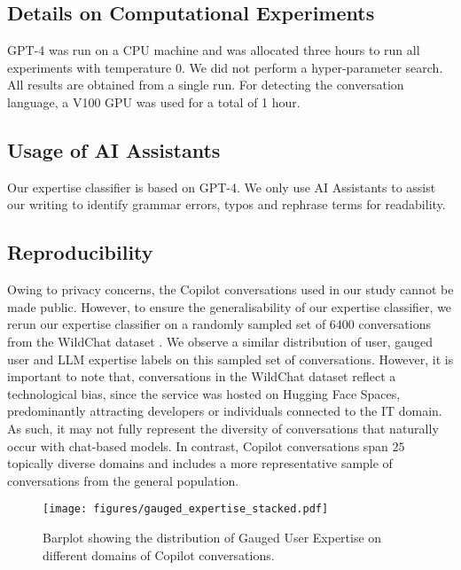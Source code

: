 \subsection{Details on Computational Experiments}
GPT-4 was run on a CPU machine and was allocated three hours to run all experiments with temperature 0. We did not perform a hyper-parameter search. All results are obtained from a single run. For detecting the conversation language, a V100 GPU was used for a total of 1 hour.

\subsection{Usage of AI Assistants}
Our expertise classifier is based on GPT-4. We only use AI Assistants to assist our writing to identify grammar errors, typos and rephrase terms for readability.







\subsection{Reproducibility}\label{wildchat}
Owing to privacy concerns, the Copilot conversations used in our study cannot be made public. However, to ensure the generalisability of our expertise classifier, we rerun our expertise classifier on a randomly sampled set of $6400$ conversations from the WildChat dataset \cite{zhao2024wildchat1mchatgptinteraction}. We observe a similar distribution of user, gauged user and LLM expertise labels on this sampled set of conversations. However, it is important to note that, conversations in the WildChat dataset reflect a technological bias, since the service was hosted on Hugging Face Spaces, predominantly attracting developers or individuals connected to the IT domain. As such, it may not fully represent the diversity of conversations that naturally occur with chat-based models. In contrast, Copilot conversations span $25$ topically diverse domains and includes a more representative sample of conversations from the general population.

\begin{figure}[t!]
    \centering
    \texttt{[image: figures/gauged\_expertise\_stacked.pdf]}
    \caption{Barplot showing the distribution of Gauged User Expertise on different domains of Copilot conversations.}\label{fig:gauged_user_dist}
\end{figure}

